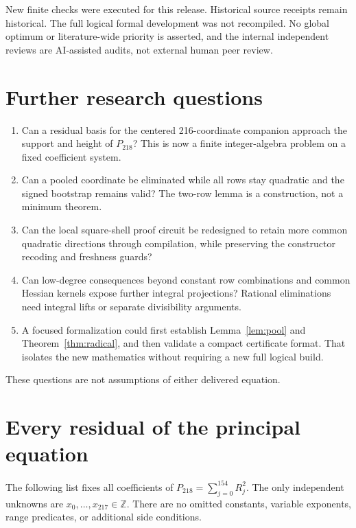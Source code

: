 \documentclass[11pt,letterpaper]{article}
\theoremstyle{remark}
\newcommand{\Z}{\mathbb Z}
\begin{document}
New finite checks were executed for this release. Historical
source receipts remain historical. The full logical formal
development was not recompiled. No global optimum or
literature-wide priority is asserted, and the internal
independent reviews are AI-assisted audits, not external
human peer review.

\section{Further research questions}

\begin{enumerate}
\item Can a residual basis for the centered 216-coordinate
companion approach the support and height of \(P_{218}\)?
This is now a finite integer-algebra problem on a fixed
coefficient system.
\item Can a pooled coordinate be eliminated while all rows
stay quadratic and the signed bootstrap remains valid?
The two-row lemma is a construction, not a minimum theorem.
\item Can the local square-shell proof circuit be redesigned
to retain more common quadratic directions through compilation,
while preserving the constructor recoding and freshness guards?
\item Can low-degree consequences beyond constant row
combinations and common Hessian kernels expose further
integral projections? Rational eliminations need integral
lifts or separate divisibility arguments.
\item A focused formalization could first establish
Lemma~\ref{lem:pool} and Theorem~\ref{thm:radical}, and then
validate a compact certificate format. That isolates the new
mathematics without requiring a new full logical build.
\end{enumerate}

These questions are not assumptions of either delivered equation.

\appendix
\section{Every residual of the principal equation}
\label{app:residuals}

The following list fixes all coefficients of
\(P_{218}=\sum_{j=0}^{154}R_j^2\).
The only independent unknowns are
\(x_0,\ldots,x_{217}\in\Z\).
There are no omitted constants, variable exponents, range
predicates, or additional side conditions.
\end{document}
